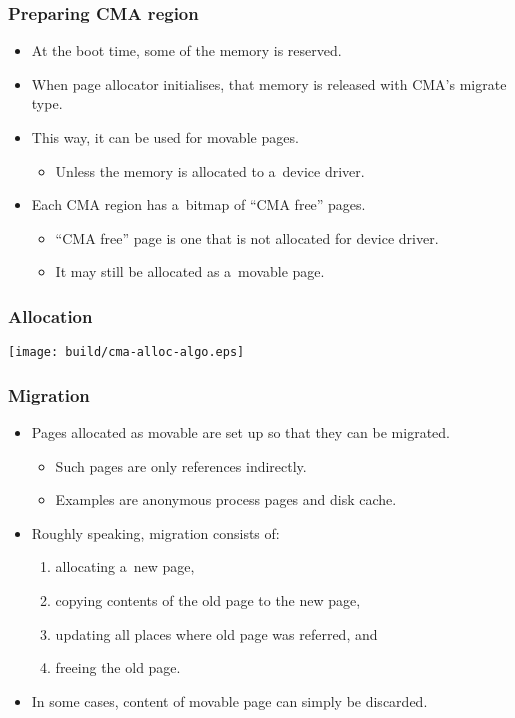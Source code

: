 \begin{frame}
  \frametitle{Preparing CMA region}

  \begin{itemize}
  \item At the boot time, some of the memory is reserved.
  \item When page allocator initialises, that memory is released with
    CMA's migrate type.
  \item This way, it can be used for movable pages.
    \begin{itemize}
    \item Unless the memory is allocated to a~device driver.
    \end{itemize}
  \item Each CMA region has a~bitmap of “CMA free” pages.
    \begin{itemize}
    \item “CMA free” page is one that is not allocated for device
      driver.
    \item It may still be allocated as a~movable page.
    \end{itemize}
  \end{itemize}
\end{frame}

\begin{frame}
  \frametitle{Allocation}

  \begin{center}
    \texttt{[image: build/cma-alloc-algo.eps]}
  \end{center}

\end{frame}

\begin{frame}
  \frametitle{Migration}

  \begin{itemize}
  \item Pages allocated as movable are set up so that they can be
    migrated.
    \begin{itemize}
    \item Such pages are only references indirectly.
    \item Examples are anonymous process pages and disk cache.
    \end{itemize}
  \item Roughly speaking, migration consists of:
    \begin{enumerate}
    \item allocating a~new page,
    \item copying contents of the old page to the new page,
    \item updating all places where old page was referred, and
    \item freeing the old page.
    \end{enumerate}
  \item In some cases, content of movable page can simply be
    discarded.
  \end{itemize}

\end{frame}

